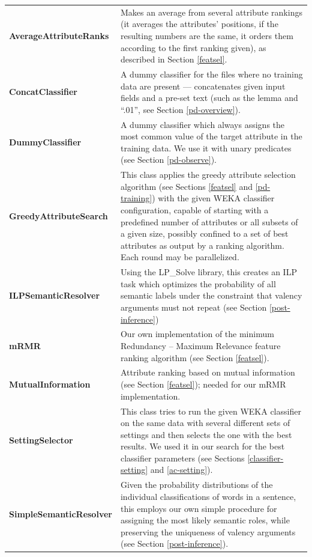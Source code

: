 \documentclass[12pt,notitlepage]{report}
\begin{document}
\footnotesize
\renewcommand{\arraystretch}{1.5}
\begin{longtable}{p{}p{}}
\bf AverageAttributeRanks & Makes an average from several attribute rankings (it averages the attributes' positions, if the resulting numbers are the same, it orders them according to the first ranking given), as described in Section \ref{featsel}. \\
\bf ConcatClassifier & A dummy classifier for the files where no training data are present --- concatenates given input fields and a pre-set text (such as the lemma and ``.01'', see Section \ref{pd-overview}). \\
\bf DummyClassifier & A dummy classifier which always assigns the most common value of the target attribute in the training data. We use it with unary predicates (see Section \ref{pd-observe}). \\
\bf GreedyAttributeSearch & This class applies the greedy attribute selection algorithm (see Sections \ref{featsel} and \ref{pd-training}) with the given WEKA classifier configuration, capable of starting with a predefined number of attributes or all subsets of a given size, possibly confined to a set of best attributes as output by a ranking algorithm. Each round may be parallelized. \\
\bf ILPSemanticResolver & Using the LP\_Solve library, this creates an ILP task which optimizes the probability of all semantic labels under the constraint that valency arguments must not repeat (see Section \ref{post-inference}) \\
\bf mRMR & Our own implementation of the minimum Redundancy -- Maximum Relevance feature ranking algorithm (see Section \ref{featsel}). \\
\bf MutualInformation & Attribute ranking based on mutual information (see Section \ref{featsel}); needed for our mRMR implementation. \\
\bf SettingSelector & This class tries to run the given WEKA classifier on the same data with several different sets of settings and then selects the one with the best results. We used it in our search for the best classifier parameters (see Sections \ref{classifier-setting} and \ref{ac-setting}). \\
\bf SimpleSemanticResolver & Given the probability distributions of the individual classifications of words in a sentence, this employs our own simple procedure for assigning the most likely semantic roles, while preserving the uniqueness of valency arguments (see Section \ref{post-inference}). \\

\end{longtable}
\end{document}

